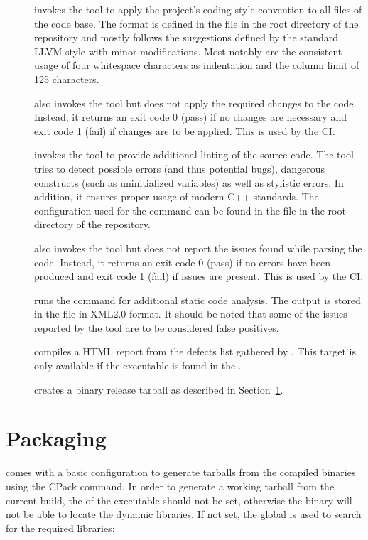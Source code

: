 \begin{description}
  \item[] invokes the  tool to apply the project's coding style convention to all files of the code base. The format is defined in the  file in the root directory of the repository and mostly follows the suggestions defined by the standard LLVM style with minor modifications. Most notably are the consistent usage of four whitespace characters as indentation and the column limit of 125 characters.
  \item[] also invokes the  tool but does not apply the required changes to the code. Instead, it returns an exit code 0 (pass) if no changes are necessary and exit code 1 (fail) if changes are to be applied. This is used by the CI.
  \item[] invokes the  tool to provide additional linting of the source code. The tool tries to detect possible errors (and thus potential bugs), dangerous constructs (such as uninitialized variables) as well as stylistic errors. In addition, it ensures proper usage of modern C++ standards. The configuration used for the  command can be found in the  file in the root directory of the repository.
  \item[] also invokes the  tool but does not report the issues found while parsing the code. Instead, it returns an exit code 0 (pass) if no errors have been produced and exit code 1 (fail) if issues are present. This is used by the CI.
  \item[] runs the  command for additional static code analysis. The output is stored in the file  in XML2.0 format. It should be noted that some of the issues reported by the tool are to be considered false positives.
  \item[] compiles a HTML report from the defects list gathered by . This target is only available if the  executable is found in the .
  \item[] creates a binary release tarball as described in Section~\ref{sec:packaging}.
\end{description}

\section{Packaging}
\label{sec:packaging}
\apsq comes with a basic configuration to generate tarballs from the compiled binaries using the CPack command. In order to generate a working tarball from the current \apsq build, the  of the executable should not be set, otherwise the  binary will not be able to locate the dynamic libraries. If not set, the global  is used to search for the required libraries:

